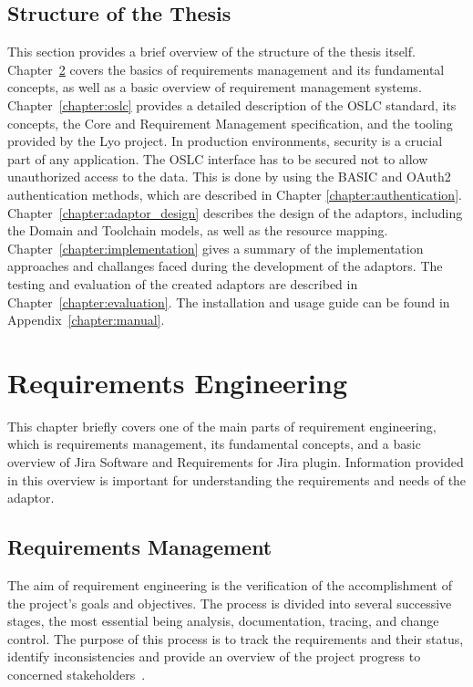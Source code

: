 \section{Structure of the Thesis}
This section provides a brief overview of the structure of the thesis itself. Chapter \ref{chapter:background} covers the basics of requirements management and its fundamental concepts, as well as a basic overview of requirement management systems. Chapter \ref{chapter:oslc} provides a detailed description of the OSLC standard, its concepts, the Core and Requirement Management specification, and the tooling provided by the Lyo project. In production environments, security is a crucial part of any application. The OSLC interface has to be secured not to allow unauthorized access to the data. This is done by using the BASIC and OAuth2 authentication methods, which are described in Chapter \ref{chapter:authentication}. Chapter \ref{chapter:adaptor_design} describes the design of the adaptors, including the Domain and Toolchain models, as well as the resource mapping. Chapter \ref{chapter:implementation} gives a summary of the implementation approaches and challanges faced during the development of the adaptors. The testing and evaluation of the created adaptors are described in Chapter \ref{chapter:evaluation}. The installation and usage guide can be found in Appendix \ref{chapter:manual}.


\chapter{Requirements Engineering}
\label{chapter:background}
This chapter briefly covers one of the main parts of requirement engineering, which is requirements management, its fundamental concepts, and a basic overview of Jira Software and Requirements for Jira plugin. Information provided in this overview is important for understanding the requirements and needs of the adaptor.

\section{Requirements Management}
The aim of requirement engineering is the verification of the accomplishment of the project's goals and objectives. The process is divided into several successive stages, the most essential being analysis, documentation, tracing, and change control. The purpose of this process is to track the requirements and their status, identify inconsistencies and provide an overview of the project progress to concerned stakeholders \cite{requirements_management}.

